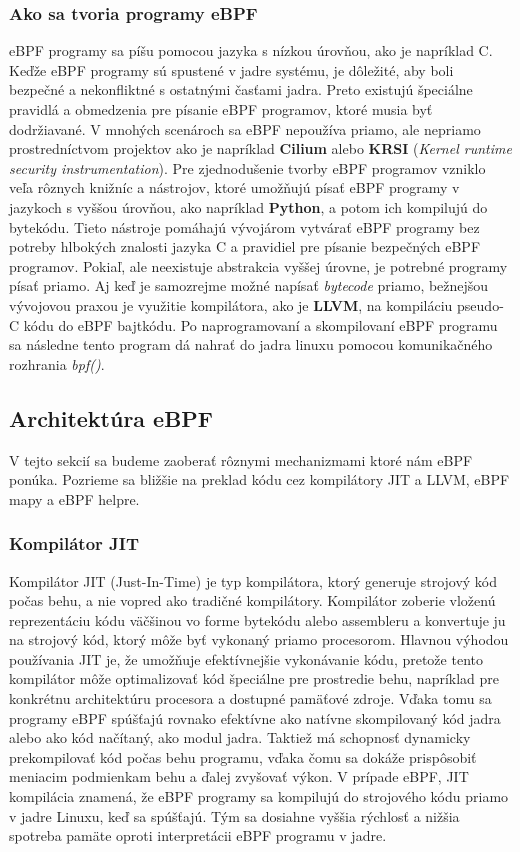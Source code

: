 \subsubsection{Ako sa tvoria programy eBPF}
eBPF programy sa píšu pomocou jazyka s nízkou úrovňou, ako je napríklad C. Keďže eBPF programy sú spustené v jadre systému, je dôležité, 
aby boli bezpečné a nekonfliktné s ostatnými časťami jadra. Preto existujú špeciálne pravidlá a obmedzenia pre písanie eBPF programov, 
ktoré musia byť dodržiavané. V mnohých scenároch sa eBPF nepoužíva priamo, ale nepriamo prostredníctvom projektov ako je napríklad 
\textbf{Cilium} alebo \textbf{KRSI} (\emph{Kernel runtime security instrumentation}). Pre zjednodušenie tvorby eBPF programov vzniklo veľa rôznych 
knižníc a nástrojov, ktoré umožňujú písať eBPF programy v jazykoch s vyššou úrovňou, ako napríklad \textbf{Python}, a potom ich kompilujú do bytekódu. 
Tieto nástroje pomáhajú vývojárom vytvárať eBPF programy bez potreby hlbokých znalosti jazyka C a pravidiel pre písanie bezpečných eBPF programov. 
Pokiaľ, ale neexistuje abstrakcia vyššej úrovne, je potrebné programy písať priamo. Aj keď je samozrejme možné napísať \emph{bytecode} priamo, 
bežnejšou vývojovou praxou je využitie kompilátora, ako je \textbf{LLVM}, na kompiláciu pseudo-C kódu do eBPF bajtkódu. 
Po naprogramovaní a skompilovaní eBPF programu sa následne tento program dá nahrať do jadra linuxu pomocou komunikačného rozhrania \emph{bpf()}.~\cite{eBPF}
\pagebreak

\subsection{Architektúra eBPF}
\label{sec:architecture}
V tejto sekcií sa budeme zaoberať rôznymi mechanizmami ktoré nám eBPF ponúka. Pozrieme sa bližšie na preklad kódu cez 
kompilátory JIT a LLVM, eBPF mapy a eBPF helpre. 

\subsubsection{Kompilátor JIT}
Kompilátor JIT (Just-In-Time) je typ kompilátora, ktorý generuje strojový kód počas behu, a nie vopred ako tradičné kompilátory. 
Kompilátor zoberie vloženú reprezentáciu kódu  väčšinou vo forme bytekódu alebo assembleru a konvertuje ju na strojový kód, ktorý môže byť vykonaný priamo procesorom. 
Hlavnou výhodou používania JIT je, že umožňuje efektívnejšie vykonávanie kódu, pretože tento kompilátor môže optimalizovať kód špeciálne pre prostredie behu, 
napríklad pre konkrétnu architektúru procesora a dostupné pamäťové zdroje. Vďaka tomu sa programy eBPF spúšťajú rovnako efektívne ako natívne skompilovaný 
kód jadra alebo ako kód načítaný, ako modul jadra. Taktiež má  schopnosť dynamicky prekompilovať kód počas behu programu, vďaka čomu sa dokáže prispôsobiť 
meniacim podmienkam behu a ďalej zvyšovať výkon. V prípade eBPF, JIT kompilácia znamená, že eBPF programy sa kompilujú do strojového kódu priamo v jadre Linuxu, 
keď sa spúšťajú. Tým sa dosiahne vyššia rýchlosť a nižšia spotreba pamäte oproti interpretácii eBPF programu v jadre.~\cite{eBPF}

